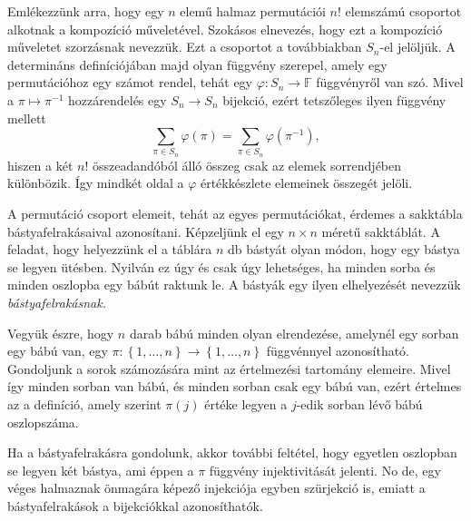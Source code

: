 \documentclass[9pt, a4paper, showtrims]{memoir}
\theoremstyle{plain}
\theoremstyle{remark}
\theoremstyle{definition}
\begin{document}
Emlékezzünk arra,
hogy egy $n$ elemű halmaz permutációi $n!$ elemszámú csoportot alkotnak a kompozíció műveletével.
Szokásos elnevezés, hogy ezt a kompozíció műveletet szorzásnak nevezzük.
Ezt a csoportot a továbbiakban $S_{n}$-el jelöljük.
A determináns definíciójában majd olyan függvény szerepel,
amely egy permutációhoz egy számot rendel,
tehát egy $\varphi:S_n\to\mathbb{F}$ függvényről van szó.
Mivel a $\pi\mapsto \pi^{-1}$ hozzárendelés egy $S_n\to S_n$ bijekció,
ezért tetszőleges ilyen függvény mellett
\[
	\sum_{\pi\in S_n}\varphi\left( \pi \right)=
	\sum_{\pi\in S_n}\varphi\left( \pi^{-1} \right),
\]
hiszen a két $n!$ összeadandóból álló összeg csak az elemek sorrendjében különbözik.
Így mindkét oldal a $\varphi$ értékkészlete elemeinek összegét jelöli.

A permutáció csoport elemeit,
tehát az egyes permutációkat,
érdemes a sakktábla bástyafelrakásaival azonosítani.
Képzeljünk el egy $n\times n$ méretű sakktáblát.
A feladat, hogy helyezzünk el a táblára $n$ db bástyát olyan módon,
hogy egy bástya se legyen ütésben.
Nyilván ez úgy és csak úgy lehetséges,
ha minden sorba és minden oszlopba egy bábút raktunk le.
A bástyák egy ilyen elhelyezését nevezzük \emph{bástyafelrakásnak.}

Vegyük észre, hogy $n$ darab bábú minden olyan elrendezése,
amelynél egy sorban egy bábú van, egy
\begin{math}
	\pi:\left\{ 1,\ldots,n \right\} \to \left\{ 1,\ldots,n \right\}
\end{math}
függvénnyel azonosítható.
Gondoljunk a sorok számozására mint az értelmezési tartomány elemeire.
Mivel így minden sorban van bábú,
és minden sorban csak egy bábú van,
ezért értelmes az a definíció,
amely szerint  $\pi\left( j \right)$ értéke legyen a $j$-edik sorban lévő bábú oszlopszáma.

Ha a bástyafelrakásra gondolunk,
akkor további feltétel,
hogy egyetlen oszlopban se legyen két bástya,
ami éppen a $\pi$ függvény injektivitását jelenti.
No de, egy véges halmaznak önmagára képező injekciója egyben szürjekció is,
emiatt a bástyafelrakások a bijekciókkal azonosíthatók.
\end{document}
